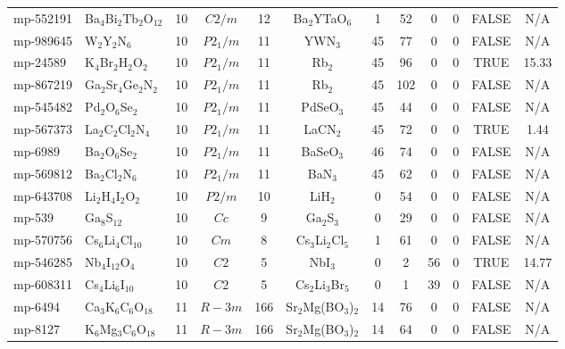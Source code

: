 {\begin{longtable}{llcccccccccc}
    mp-552191 & Ba$_{4}$Bi$_{2}$Tb$_{2}$O$_{12}$ & 10    & $C2/m$ & 12    & Ba$_{2}$YTaO$_{6}$ & 1     & 52    & 0     & 0     & FALSE & N/A \\
    mp-989645 & W$_{2}$Y$_{2}$N$_{6}$ & 10    & $P2_1/m$ & 11    & YWN$_{3}$ & 45    & 77    & 0     & 0     & FALSE & N/A \\
    mp-24589 & K$_{4}$Br$_{2}$H$_{2}$O$_{2}$ & 10    & $P2_1/m$ & 11    & Rb$_{2}$ & 45    & 96    & 0     & 0     & TRUE  & 15.33  \\
    mp-867219 & Ga$_{2}$Sr$_{4}$Ge$_{2}$N$_{2}$ & 10    & $P2_1/m$ & 11    & Rb$_{2}$ & 45    & 102   & 0     & 0     & FALSE & N/A \\
    mp-545482 & Pd$_{2}$O$_{6}$Se$_{2}$ & 10    & $P2_1/m$ & 11    & PdSeO$_{3}$ & 45    & 44    & 0     & 0     & FALSE & N/A \\
    mp-567373 & La$_{2}$C$_{2}$Cl$_{2}$N$_{4}$ & 10    & $P2_1/m$ & 11    & LaCN$_{2}$ & 45    & 72    & 0     & 0     & TRUE  & 1.44  \\
    mp-6989 & Ba$_{2}$O$_{6}$Se$_{2}$ & 10    & $P2_1/m$ & 11    & BaSeO$_{3}$ & 46    & 74    & 0     & 0     & FALSE & N/A \\
    mp-569812 & Ba$_{2}$Cl$_{2}$N$_{6}$ & 10    & $P2_1/m$ & 11    & BaN$_{3}$ & 45    & 62    & 0     & 0     & FALSE & N/A \\
    mp-643708 & Li$_{2}$H$_{4}$I$_{2}$O$_{2}$ & 10    & $P2/m$ & 10    & LiH$_{2}$ & 0     & 54    & 0     & 0     & FALSE & N/A \\
    mp-539 & Ga$_{8}$S$_{12}$ & 10    & $Cc$  & 9     & Ga$_{2}$S$_{3}$ & 0     & 29    & 0     & 0     & FALSE & N/A \\
    mp-570756 & Cs$_{6}$Li$_{4}$Cl$_{10}$ & 10    & $Cm$  & 8     & Cs$_{3}$Li$_{2}$Cl$_{5}$ & 1     & 61    & 0     & 0     & FALSE & N/A \\
    mp-546285 & Nb$_{4}$I$_{12}$O$_{4}$ & 10    & $C2$  & 5     & NbI$_{3}$ & 0     & 2     & 56    & 0     & TRUE  & 14.77  \\
    mp-608311 & Cs$_{4}$Li$_{6}$I$_{10}$ & 10    & $C2$  & 5     & Cs$_{2}$Li$_{3}$Br$_{5}$ & 0     & 1     & 39    & 0     & FALSE & N/A \\
    mp-6494 & Ca$_{3}$K$_{6}$C$_{6}$O$_{18}$ & 11    & $R-3m$ & 166   & Sr$_{2}$Mg(BO$_{3}$)$_{2}$ & 14    & 76    & 0     & 0     & FALSE & N/A \\
    mp-8127 & K$_{6}$Mg$_{3}$C$_{6}$O$_{18}$ & 11    & $R-3m$ & 166   & Sr$_{2}$Mg(BO$_{3}$)$_{2}$ & 14    & 64    & 0     & 0     & FALSE & N/A \\

\end{longtable}}
